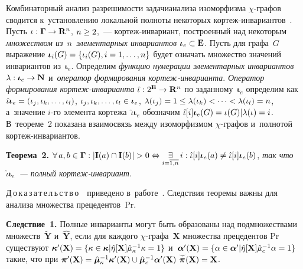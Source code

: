 \begin{multicols}{2}
     Комбинаторный анализ разрешимости задачи\linebreak анализа изоморфизма  
$\chi$-гра\-фов сводится к~уста\-нов\-ле\-нию локальной полноты некоторых 
 кор\-теж-ин\-ва\-ри\-ан\-тов~\cite{8-tr}. Пусть $\iota: 
\boldsymbol{\Gamma}\hm\to \mathbf{R}^n$, $n\hm\geq 2$,~---  
кор\-теж-ин\-ва\-ри\-ант, построенный над некоторым \textit{\mbox{множеством} 
из}~$n$~\textit{элементарных инвариантов} $\boldsymbol{\iota}_e\hm\subset 
\mathbf{E}$. Пусть для графа~$G$ выражение $\boldsymbol{\iota}_i(G)\hm= \{ 
\iota_i(G), i\hm= 1,\ldots , n\}$ будет означать множество значений инвариантов 
из~$\boldsymbol{\iota}_e$. Определим \textit{функцию нумерации 
элементарных инвариантов} $\lambda: \boldsymbol{\iota}_e\hm\to \mathbf{N}$ и~\textit{оператор формирования  
кор\-теж-ин\-ва\-ри\-ан\-та}. \textit{Оператор формирования  
кор\-теж-ин\-ва\-ри\-ан\-та} $\hat{\iota}: 2^{\mathbf{E}}\hm\to \mathbf{R}^n$ по 
заданному~$\boldsymbol{\iota}_e$ определим как 
$\hat{\iota}\boldsymbol{\iota}_e\hm= (\iota_j, \iota_k, \ldots , \iota_l)$, $\iota_j, 
\iota_k,\ldots , \iota_l\hm\in \boldsymbol{\iota}_e$, $\lambda(\iota_j)\hm= 1\hm\leq 
\lambda(\iota_k)< \cdots < \lambda(\iota_l)\hm=n$, а~значение $i$-го элемента 
кортежа~$\hat{\iota}\boldsymbol{\iota}_e$ обозначим 
$\hat{\iota}[i]\boldsymbol{\iota}_e(G)\hm=\iota(G)\vert \lambda(\iota)\hm=i$. 
В~теореме~2 показана взаимосвязь между изоморфизмом $\chi$-гра\-фов 
и~полнотой кор\-теж-ин\-ва\-ри\-ан\-тов.
     
     \smallskip
     
     \noindent
     \textbf{Теорема~2.} $\forall\,a,b\in\boldsymbol{\Gamma}: \vert 
\mathbf{I}(a)\cap \mathbf{I}(b)\vert >0 \hm\Leftrightarrow 
\underset{i=\overline{1,n}}{\exists}\, i: \hat{\iota}[i] \boldsymbol{\iota}_e (a)\not= 
\hat{\iota}[i]\boldsymbol{\iota}_e(b)$, \textit{так что 
$\hat{\iota}\boldsymbol{\iota}_e$~--- полный кор\-теж-ин\-ва\-ри\-ант}. 

\smallskip
     
     Д\,о\,к\,а\,з\,а\,т\,е\,л\,ь\,с\,т\,в\,о\ \ приведено в~работе~\cite{9-tr}. 
Следствия теоремы важны для анализа множества прецедентов~Pr.
     
     \smallskip

\noindent
\textbf{Следствие~1.} Полные инварианты могут быть образованы над 
подмножествами множеств~$\tilde{\mathbf{Y}}$ и~$\hat{\mathbf{Y}}$, если 
для каждого $\chi$-гра\-фа~$\mathbf{X}$ множества прецедентов 
$\mathrm{Pr}$ существуют $\boldsymbol{\kappa}^\prime(\mathbf{X}) \hm= 
\{\kappa\hm\in \boldsymbol{\kappa} \vert \hat{\eta}[\mathbf{X}] 
\hat{\mu}_\kappa^{-1} \kappa \hm=1\}$ и~$\boldsymbol{\alpha}^\prime 
(\mathbf{X})\hm= \{\alpha \hm\in \boldsymbol{\alpha}^\prime \vert 
\hat{\eta}[\mathbf{X}] \hat{\mu}^{-1}_{c}\alpha \hm=1\}$ такие, что при 
$\boldsymbol{\pi}^\prime(\mathbf{X})\hm= \hat{\boldsymbol{\mu}}_\kappa^{-1}
\boldsymbol{\kappa}^\prime(\mathbf{X})\cup \hat{\boldsymbol{\mu}}_c^{-1}
\boldsymbol{\alpha}^\prime(\mathbf{X})\ 
\overset{\smile}{\boldsymbol{\pi}}(\mathbf{X})\hm=\mathbf{X}$. 


\end{multicols}

